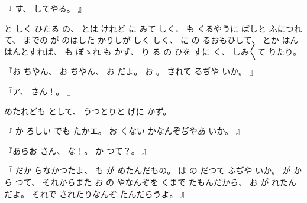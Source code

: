 %
『
す、
%
してやる。
』

%
と
しく
ひたる
の、
%
とは
けれど
に
みて
しく、
%
も
くるやうに
ばしと
ふにつれて、
%
までの
が
のはした
かりしが
しく
しく、
%
に
の
るおもひして、
%
とか
はん
はんとすれば、
%
も
ぼゝれ
も
かず、
%
り
る
の
ひを
すに
く、
%
しみ〳〵て
りたり。

%
『お
ちやん、
%
お
ちやん、
%
お
だよ。
%
お
。
%
されて
るぢや
いか。
』

%
『ア、
%
さん！。
』

%
めたれども
として、
%
うつとりと
げに
かず。

%
『
か
ろしい
でも
たかエ。
%
お
くない
かなんぞぢやあ
いか。
』

%
『あらお
さん、
%
な！。
%
か
つて？。
』

%
『
だか
らなかつたよ、
%
も
が
めたんだもの。
%
は
の
だつて
ふぢや
いか。
%
が
から
つて、
%
それからまた
お
の
やなんぞを
くまで
たもんだから、
%
お
が
れたんだよ。
%
それで
されたりなんぞ
たんだらうよ。
』

